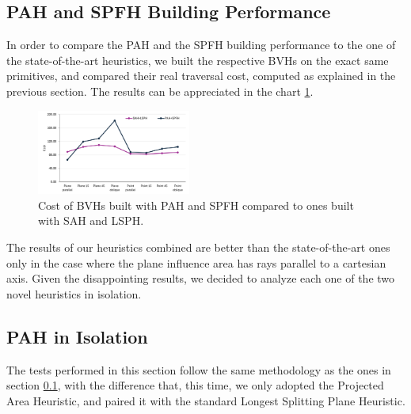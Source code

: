 \documentclass[acmtog, anonymous, review]{acmart}
\begin{document}
\subsection{PAH and SPFH Building Performance} \label{ssec:pah_spfh}
In order to compare the PAH and the SPFH building performance to the one of the state-of-the-art heuristics, we built the respective BVHs on the exact same primitives, and compared their real traversal cost, computed as explained in the previous section. The results can be appreciated in the chart \ref{fig:pah_without_fallback_faster_chart}.

\begin{figure}[H]
	\centering
	\includegraphics[width=0.45\textwidth]{Images/pah_without_fallback_faster_chart.png}
	\caption{Cost of BVHs built with PAH and SPFH compared to ones built with SAH and LSPH.}
	\label{fig:pah_without_fallback_faster_chart}
\end{figure}

The results of our heuristics combined are better than the state-of-the-art ones only in the case where the plane influence area has rays parallel to a cartesian axis. Given the disappointing results, we decided to analyze each one of the two novel heuristics in isolation.

\subsection{PAH in Isolation}
The tests performed in this section follow the same methodology as the ones in section \ref{ssec:pah_spfh}, with the difference that, this time, we only adopted the Projected Area Heuristic, and paired it with the standard Longest Splitting Plane Heuristic.
\end{document}
